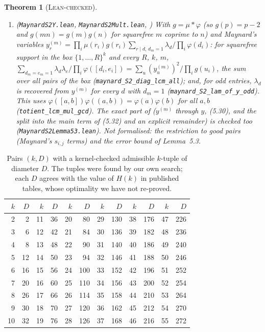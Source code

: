 \documentclass[11pt]{amsart}
\newtheorem{theorem}{Theorem}
\theoremstyle{definition}
\theoremstyle{remark}
\newcommand{\lbl}[1]{\textup{\textsc{#1}}}
\begin{document}
\begin{theorem}[\lbl{Lean-checked}]
\begin{enumerate}
pairwise coprime contribute $0$; and each remaining count is a count of $n$ with $n+h_m$ prime in one residue class
modulo $W\prod_{i\ne m}[d_i,e_i]$ (\texttt{maynard\_}\allowbreak\texttt{S2\_good\_reduced},
\texttt{maynard\_}\allowbreak\texttt{S2\_count\_residue}). Not formalised: the primes in these classes, the
Bombieri--Vinogradov input.
\item (\texttt{MaynardS2Y.lean}, \texttt{MaynardS2Mult.lean}, \cite[(5.21)--(5.23)]{May15}) With
$g=\mu*\varphi$ (so $g(p)=p-2$ and $g(mn)=g(m)g(n)$ for squarefree $m$ coprime to $n$) and Maynard's variables
$y^{(m)}_r=\prod_i\mu(r_i)g(r_i)\sum_{r\mid d,\,d_m=1}\lambda_d/\prod_i\varphi(d_i)$: for squarefree support in the box
$\{1,\dots,R\}^k$ and every $R$, $k$, $m$,
$\sum_{d_m=e_m=1}\lambda_d\lambda_e/\prod_i\varphi([d_i,e_i])=\sum_u(y^{(m)}_u)^2/\prod_ig(u_i)$, the sum over all pairs
of the box (\texttt{maynard\_}\allowbreak\texttt{S2\_diag\_lcm\_all}); and, for odd entries, $\lambda_d$ is recovered
from $y^{(m)}$ for every $d$ with $d_m=1$ (\texttt{maynard\_}\allowbreak\texttt{S2\_lam\_of\_y\_odd}). This uses
$\varphi([a,b])\varphi((a,b))=\varphi(a)\varphi(b)$ for all $a,b$ (\texttt{totient\_}\allowbreak\texttt{lcm\_mul\_gcd}).
The exact part of \cite[Lemma~5.3]{May15} ($y^{(m)}$ through $y$, (5.30), and the split into the main term of (5.32)
and an explicit remainder) is checked too (\texttt{MaynardS2Lemma53.lean}). Not formalised: the restriction to good
pairs (Maynard's $s_{i,j}$ terms) and the error bound of Lemma~5.3.
\end{enumerate}
\end{theorem}

\begin{table}[h]
\caption{Pairs $(k,D)$ with a kernel-checked admissible $k$-tuple of diameter
$D$. The tuples were found by our own search; each $D$ agrees with the value
of $H(k)$ in published tables, whose optimality we have not re-proved.}
\label{tab:tuples}
\begin{tabular}{@{}rr@{\qquad}rr@{\qquad}rr@{\qquad}rr@{\qquad}rr@{\qquad}rr@{}}
\toprule
$k$&$D$&$k$&$D$&$k$&$D$&$k$&$D$&$k$&$D$&$k$&$D$\\
\midrule
2&2&11&36&20&80&29&130&38&176&47&226\\
3&6&12&42&21&84&30&136&39&182&48&236\\
4&8&13&48&22&90&31&140&40&186&49&240\\
5&12&14&50&23&94&32&146&41&188&50&246\\
6&16&15&56&24&100&33&152&42&196&51&252\\
7&20&16&60&25&110&34&156&43&200&52&254\\
8&26&17&66&26&114&35&158&44&210&53&264\\
9&30&18&70&27&120&36&162&45&212&54&270\\
10&32&19&76&28&126&37&168&46&216&55&272\\
\bottomrule
\end{tabular}
\end{table}
\end{document}
